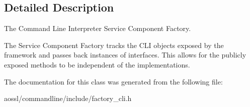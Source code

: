 \subsection{Detailed Description}
The Command Line Interpreter Service Component Factory. 

The Service Component Factory tracks the C\+LI objects exposed by the framework and passes back instances of interfaces. This allows for the publicly exposed methods to be independent of the implementations. 

The documentation for this class was generated from the following file\+:\begin{DoxyCompactItemize}
\item 
aossl/commandline/include/factory\+\_\+cli.\+h\end{DoxyCompactItemize}
